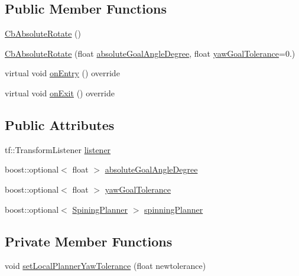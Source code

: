 \subsection*{Public Member Functions}
\begin{DoxyCompactItemize}
\item 
\hyperlink{classcl__move__base__z_1_1CbAbsoluteRotate_a378516095c2ad66f52e50f6d7c32678e}{Cb\+Absolute\+Rotate} ()
\item 
\hyperlink{classcl__move__base__z_1_1CbAbsoluteRotate_ac2149ffade91cd127e476b3ece3300dd}{Cb\+Absolute\+Rotate} (float \hyperlink{classcl__move__base__z_1_1CbAbsoluteRotate_ad5d0e21549940444e1cb525cda73329a}{absolute\+Goal\+Angle\+Degree}, float \hyperlink{classcl__move__base__z_1_1CbAbsoluteRotate_a8d8b5b9c2c821efe101bb07c96c4bdd3}{yaw\+Goal\+Tolerance}=0.)
\item 
virtual void \hyperlink{classcl__move__base__z_1_1CbAbsoluteRotate_a10418ea360809fa649d295716b152b2b}{on\+Entry} () override
\item 
virtual void \hyperlink{classcl__move__base__z_1_1CbAbsoluteRotate_a0e362b8e9f0d7de5aeee183ba4031437}{on\+Exit} () override
\end{DoxyCompactItemize}
\subsection*{Public Attributes}
\begin{DoxyCompactItemize}
\item 
tf\+::\+Transform\+Listener \hyperlink{classcl__move__base__z_1_1CbAbsoluteRotate_ad946bb6486dc35baf03ec1cc430a3406}{listener}
\item 
boost\+::optional$<$ float $>$ \hyperlink{classcl__move__base__z_1_1CbAbsoluteRotate_ad5d0e21549940444e1cb525cda73329a}{absolute\+Goal\+Angle\+Degree}
\item 
boost\+::optional$<$ float $>$ \hyperlink{classcl__move__base__z_1_1CbAbsoluteRotate_a8d8b5b9c2c821efe101bb07c96c4bdd3}{yaw\+Goal\+Tolerance}
\item 
boost\+::optional$<$ \hyperlink{classcl__move__base__z_1_1CbAbsoluteRotate_ab8d45e43594a3fc6a71c08f07b5dbef0}{Spining\+Planner} $>$ \hyperlink{classcl__move__base__z_1_1CbAbsoluteRotate_a17d836524599af072cf2e3488e491a91}{spinning\+Planner}
\end{DoxyCompactItemize}
\subsection*{Private Member Functions}
\begin{DoxyCompactItemize}
\item 
void \hyperlink{classcl__move__base__z_1_1CbAbsoluteRotate_aba8d93d615ccd43acd0684f8e88e2209}{set\+Local\+Planner\+Yaw\+Tolerance} (float newtolerance)
\end{DoxyCompactItemize}
